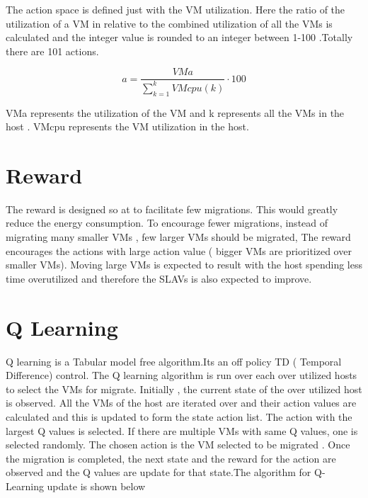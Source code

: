 \documentclass[a4paper,12pt]{Classes/RoboticsLaTeX}
\begin{document}
    The action space is defined just with the VM utilization. Here the ratio of the utilization of a VM in relative to the combined utilization of all the VMs is calculated and the integer value is rounded to an integer between 1-100 .Totally there are 101 actions.
    
    \begin{equation}
    a = \frac{VMa}{\sum_{k=1}^{k} VMcpu(k)} \cdot 100
    \end{equation}

   VMa represents the utilization of the VM and k represents all the VMs in the host . VMcpu represents the VM utilization in the host.

   \section{Reward}
   The reward is designed so at to facilitate few migrations. This would greatly reduce the energy consumption. To encourage fewer migrations, instead of migrating many smaller VMs , few larger VMs should be migrated, The reward encourages the actions with large action value ( bigger VMs are prioritized over smaller VMs). Moving large VMs is expected to result with  the host spending less time overutilized and therefore the SLAVs is also expected to improve.

    \section{Q Learning}
    Q learning is a Tabular model free algorithm.Its an off policy TD ( Temporal Difference) control. The Q learning algorithm is run over each over utilized hosts to select the VMs for migrate. Initially , the current state of the over utilized host is observed. All the VMs of the host are iterated over and their action values are calculated and this is updated to form the state action list.  The action with the largest Q values is selected. If there are multiple VMs with same Q values, one is selected randomly. The chosen action is the VM selected to be migrated . Once the migration is completed, the next state and the reward for the action are observed and the Q values are update for that state.The algorithm for Q-Learning update is shown below\cite{Lukethesis}
\end{document}
